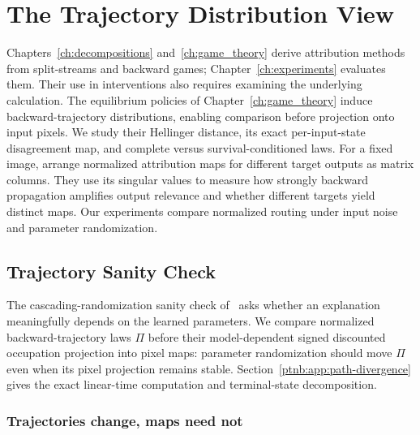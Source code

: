 \chapter{The Trajectory Distribution View}\label{ch:trajectory}

Chapters~\ref{ch:decompositions} and~\ref{ch:game_theory} derive attribution methods from split-streams and backward games; Chapter~\ref{ch:experiments} evaluates them. Their use in interventions also requires examining the underlying calculation. The equilibrium policies of Chapter~\ref{ch:game_theory} induce backward-trajectory distributions, enabling comparison before projection onto input pixels. We study their Hellinger distance, its exact per-input-state disagreement map, and complete versus survival-conditioned laws. For a fixed image, \textcite{Maess2026Spectral} arrange normalized attribution maps for different target outputs as matrix columns. They use its singular values to measure how strongly backward propagation amplifies output relevance and whether different targets yield distinct maps. Our experiments compare normalized routing under input noise and parameter randomization.

\section{Trajectory Sanity Check}\label{ptnb:sec:hellinger-sanity}\label{ptnb:sec:hellinger}

The cascading-randomization sanity check of~\textcite{Adebayo2018sanity} asks whether an explanation meaningfully depends on the learned parameters. We compare normalized backward-trajectory laws $\Pi$ before their model-dependent signed discounted occupation projection into pixel maps: parameter randomization should move $\Pi$ even when its pixel projection remains stable. Section~\ref{ptnb:app:path-divergence} gives the exact linear-time computation and terminal-state decomposition.

\subsection{Trajectories change, maps need not}\label{ptnb:sec:hellinger-cascading}

